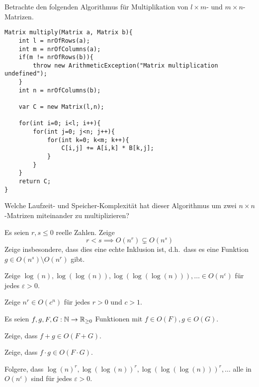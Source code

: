 
\begin{sheet}
    \begin{problem}
        Betrachte den folgenden Algorithmus für Multiplikation von $l\times m$- und $m\times n$-Matrizen.
        \begin{lstlisting}
Matrix multiply(Matrix a, Matrix b){
    int l = nrOfRows(a);
    int m = nrOfColumns(a);
    if(m != nrOfRows(b)){
        throw new ArithmeticException("Matrix multiplication undefined");
    }
    int n = nrOfColumns(b);

    var C = new Matrix(l,n);

    for(int i=0; i<l; i++){
        for(int j=0; j<n; j++){
            for(int k=0; k<m; k++){
                C[i,j] += A[i,k] * B[k,j];
            }
        }
    }
    return C;
}
        \end{lstlisting}

        Welche Laufzeit- und Speicher-Komplexität hat dieser Algorithmus um zwei $n\times n$-Matrizen miteinander zu multiplizieren?
    \end{problem}

    \begin{problem}[title={Ein paar übliche Komplexitätsklassen}]
        \begin{subproblem}
            Es seien $r,s\leq 0$ reelle Zahlen. Zeige
            \[r<s \implies O(n^r) \subsetneq O(n^s)\]
            Zeige insbesondere, dass dies eine echte Inklusion ist, d.h.\ dass es eine Funktion $g\in O(n^s) \setminus O(n^r)$ gibt.
        \end{subproblem}
        \begin{subproblem}
            Zeige $\log(n),\log(\log(n)), \log(\log(\log(n))), \ldots \in O(n^\varepsilon)$ für jedes $\varepsilon>0$.
        \end{subproblem}
        \begin{subproblem}
            Zeige $n^r \in O(c^n)$ für jedes $r>0$ und $c>1$.
        \end{subproblem}
    \end{problem}

    \begin{problem}
        Es seien $f,g,F,G:\mathbb{N}\to\mathbb{R}_{\geq 0}$ Funktionen mit $f\in O(F), g\in O(G)$.
        \begin{subproblem}
            Zeige, dass $f+g\in O(F+G)$.
        \end{subproblem}
        \begin{subproblem}
            Zeige, dass $f\cdot g\in O(F\cdot G)$.
        \end{subproblem}
        \begin{subproblem}
            Folgere, dass $\log(n)^r, \log(\log(n))^r, \log(\log(\log(n)))^r, \ldots$ alle in $O(n^\varepsilon)$ sind für jedes $\varepsilon>0$.


\end{subproblem}
\end{problem}
\end{sheet}
